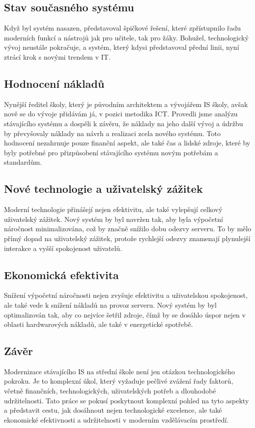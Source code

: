 \documentclass[FM,Proj]{tulthesis}
\begin{document}
\subsection*{Stav současného systému}
Když byl systém nasazen, představoval špičkové řešení, které zpřístupnilo řadu 
moderních funkcí a nástrojů jak pro učitele, tak pro žáky. Bohužel, 
technologický vývoj neustále pokračuje, a systém, který kdysi představoval 
přední linii, nyní ztrácí krok s novými trendem v IT.

\subsection*{Hodnocení nákladů}
Nynější ředitel školy, který je původním architektem a vývojářem IS školy, avšak nově
se do vývoje přidávám já, v pozici metodika ICT. Provedli jsme analýzu stávajícího systému
a dospěli k závěru, že náklady na jeho další vývoj a údržbu by převyšovaly náklady na 
návrh a realizaci zcela nového systému. Toto hodnocení nezahrnuje pouze finanční aspekt,
ale také čas a lidské zdroje, které by byly potřebné pro přizpůsobení stávajícího systému
 novým potřebám a standardům.

\subsection*{Nové technologie a uživatelský zážitek}
Moderní technologie přinášejí nejen efektivitu, ale také vylepšují celkový uživatelský zážitek.
Nový systém by byl navržen tak, aby byla výpočetní náročnost minimalizována, což by značně 
snížilo dobu odezvy serveru. To by mělo přímý dopad na uživatelský zážitek, protože 
rychlejší odezvy znamenají plynulejší interakce a vyšší spokojenost uživatelů.

\subsection*{Ekonomická efektivita}
Snížení výpočetní náročnosti nejen zvyšuje efektivitu a uživatelskou spokojenost, ale 
také vede k snížení nákladů na provoz serveru. Nový systém by byl optimalizován tak, 
aby co nejvíce šetřil zdroje, čímž by se dosáhlo úspor nejen v oblasti hardwarových nákladů,
ale také v energetické spotřebě.

\subsection*{Závěr}
Modernizace stávajícího IS na střední škole není jen otázkou technologického pokroku.
Je to komplexní úkol, který vyžaduje pečlivé zvážení řady faktorů, včetně finančních, 
technologických, uživatelských potřeb a dlouhodobé udržitelnosti. Tato práce se pokusí 
poskytnout komplexní pohled na tyto aspekty a představit cestu, jak dosáhnout nejen 
technologické excelence, ale také ekonomické efektivnosti a udržitelnosti v moderním 
vzdělávacím prostředí.
\end{document}
